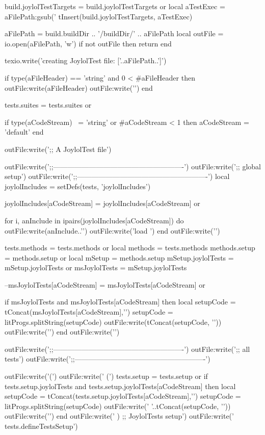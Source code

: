   build.joylolTestTargets = build.joylolTestTargets or { }
  local aTestExec = aFilePath:gsub('%
  tInsert(build.joylolTestTargets, aTestExec)

  aFilePath = build.buildDir .. '/buildDir/' .. aFilePath
  local outFile = io.open(aFilePath, 'w')
  if not outFile then
    return
  end
  
  texio.write('creating JoylolTest file: ['..aFilePath..']\n')
  
  if type(aFileHeader) == 'string'
    and 0 < #aFileHeader then
    outFile:write(aFileHeader)
    outFile:write('\n\n')
  end

  tests.suites = tests.suites or { }

  if type(aCodeStream) ~= 'string'
    or #aCodeStream < 1 then
    aCodeStream = 'default'
  end

  outFile:write(';; A JoylolTest file\n\n')
  
  outFile:write(';;-------------------------------------------------------\n')
  outFile:write(';; global setup\n')
  outFile:write(';;-------------------------------------------------------\n\n')
  local joylolIncludes = setDefs(tests, 'joylolIncludes')

  joylolIncludes[aCodeStream] = joylolIncludes[aCodeStream] or { }

  for i, anInclude in ipairs(joylolIncludes[aCodeStream]) do
    outFile:write(anInclude..'\n')
    outFile:write('load \n\n')
  end
  outFile:write('\n')

  tests.methods = tests.methods or { }
  local methods = tests.methods
  methods.setup = methods.setup or { }
  local mSetup  = methods.setup
  mSetup.joylolTests = mSetup.joylolTests or { }
  msJoylolTests      = mSetup.joylolTests

  --msJoylolTests[aCodeStream] = msJoylolTests[aCodeStream] or { }
  
  if msJoylolTests and
    msJoylolTests[aCodeStream] then
    local setupCode = tConcat(msJoylolTests[aCodeStream],'\n')
    setupCode       = litProgs.splitString(setupCode)
    outFile:write(tConcat(setupCode, '\n'))
    outFile:write('\n')
  end
  outFile:write('\n')

  outFile:write(';;-------------------------------------------------------\n')
  outFile:write(';; all tests\n')
  outFile:write(';;-------------------------------------------------------\n')

  outFile:write('(\n')
  outFile:write('  (\n')
  tests.setup = tests.setup or { }
  if tests.setup.joylolTests and
    tests.setup.joylolTests[aCodeStream] then
    local setupCode = tConcat(tests.setup.joylolTests[aCodeStream],'\n')
    setupCode       = litProgs.splitString(setupCode)
    outFile:write('  '..tConcat(setupCode, '\n  '))
    outFile:write('\n')
  end
  outFile:write('  ) ;; JoylolTests setup\n')
  outFile:write('  tests.defineTestsSetup\n\n')

